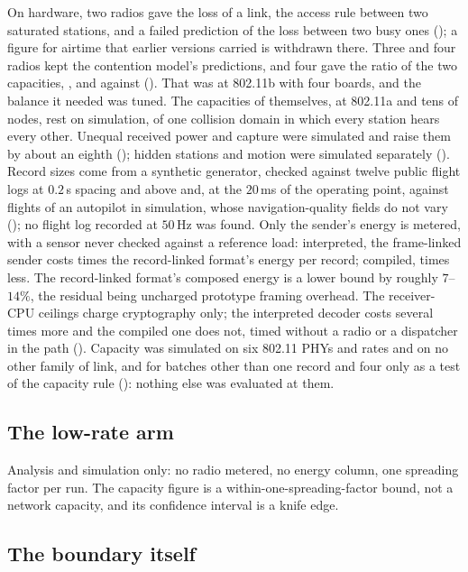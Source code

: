 On hardware, two radios gave the loss of a link, the access rule between two saturated
stations, and a failed prediction of the loss between two busy ones (); a
figure for airtime that earlier versions carried is withdrawn there. Three and four radios kept
the contention model's predictions, and four gave the ratio of the two capacities, \hwRatio,
\hwRepeatRatio{} and \hwThirdRatio{} against \hwModelRatio{} (). That was at 802.11b with four
boards, and the balance it needed was tuned. The capacities of  themselves, at
802.11a and tens of nodes, rest on simulation, of one collision domain in which every station hears
every other. Unequal received power and capture were simulated and raise
them by about an eighth (); hidden stations and motion were simulated
separately (). Record sizes come from a synthetic generator, checked
against twelve public flight logs at $0.2$\,s spacing and above and, at the $20$\,ms of the
operating point, against flights of an autopilot in simulation, whose navigation-quality fields
do not vary (); no flight log recorded at $50$\,Hz was found. Only the
sender's energy is metered, with a sensor never checked against a reference load: interpreted,
the frame-linked sender costs \enLeanOverFirst{} times the record-linked format's energy per record; compiled,
\enFirstOverRust{} times less. The record-linked format's composed energy is a lower bound by roughly
$7$--$14\%$, the residual being uncharged prototype framing overhead. The receiver-CPU ceilings
charge cryptography only; the interpreted decoder costs several times more and the compiled one
does not, timed without a radio or a dispatcher in the path (). Capacity was
simulated on six 802.11 PHYs and rates and on no other family of link, and for batches other
than one record and four only as a test of the capacity rule (): nothing
else was evaluated at them.

\subsection{The low-rate arm}

Analysis and simulation only: no radio metered, no energy column, one spreading factor per run.
The capacity figure is a within-one-spreading-factor bound, not a network capacity, and its
confidence interval is a knife edge.

\subsection{The boundary itself}

